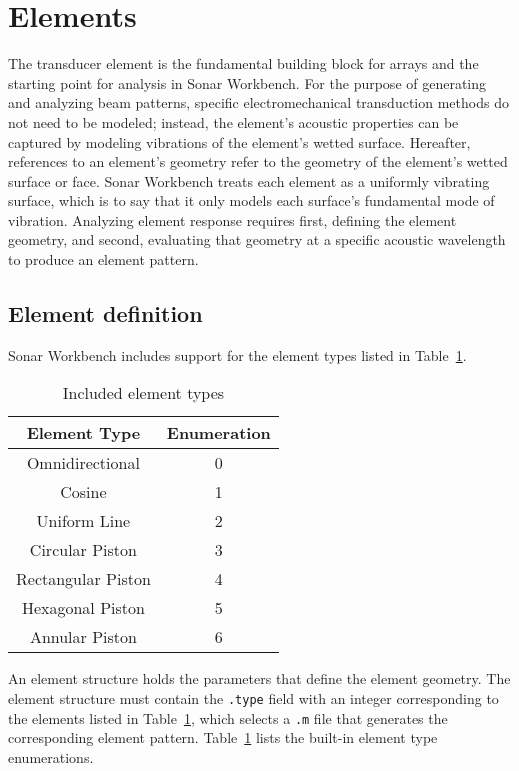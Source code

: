 \section{Elements}\label{sec:element}

The transducer element is the fundamental building block for arrays and the starting point for analysis in Sonar Workbench. For the purpose of generating and analyzing beam patterns, specific electromechanical transduction methods do not need to be modeled; instead, the element's acoustic properties can be captured by modeling vibrations of the element's wetted surface. Hereafter, references to an element's geometry refer to the geometry of the element's wetted surface or face. Sonar Workbench treats each element as a uniformly vibrating surface, which is to say that it only models each surface's fundamental mode of vibration. Analyzing element response requires first, defining the element geometry, and second, evaluating that geometry at a specific acoustic wavelength to produce an element pattern.

\subsection{Element definition}

Sonar Workbench includes support for the element types listed in Table~\ref{tab:ElementTypes}. 

\begin{table}[!ht]
	\begin{center}
		\caption{Included element types}
		\label{tab:ElementTypes}
		\begin{tabular}{c|c} 
			\textbf{Element Type} & \textbf{Enumeration} \\
			\hline
			Omnidirectional  & 0 \\
			Cosine & 1 \\
			Uniform Line & 2 \\
			Circular Piston & 3 \\
			Rectangular Piston & 4 \\
			Hexagonal Piston & 5 \\
			Annular Piston & 6 \\
		\end{tabular}
	\end{center}
\end{table}

An element structure holds the parameters that define the element geometry. The element structure must contain the \texttt{.type} field with an integer corresponding to the elements listed in Table~\ref{tab:ElementTypes}, which selects a \texttt{.m} file that generates the corresponding element pattern. Table~\ref{tab:ElementTypes} lists the built-in element type enumerations.

